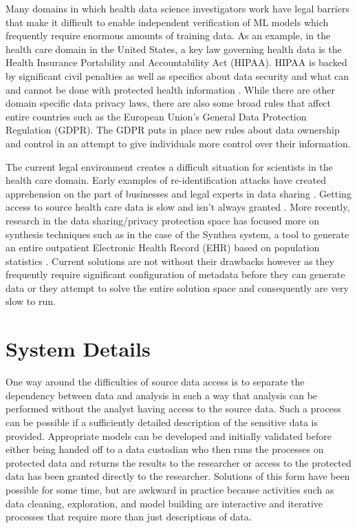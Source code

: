 \documentclass{amia}
\begin{document}
Many domains in which health data science investigators work have legal barriers that make it difficult to enable independent verification of ML models which frequently require enormous amounts of training data. As an example, in the health care domain in the United States, a key law governing health data is the Health Insurance Portability and Accountability Act (HIPAA). HIPAA is backed by significant civil penalties as well as specifics about data security and what can and cannot be done with protected health information \cite{hippaviol}. While there are other domain specific data privacy laws, there are also some broad rules that affect entire countries such as the European Union's General Data Protection Regulation (GDPR). The GDPR puts in place new rules about data ownership and control in an attempt to give individuals more control over their information.

The current legal environment creates a difficult situation for scientists in the health care domain. Early examples of re-identification attacks \cite{sweeney_2002} have created apprehension on the part of businesses and legal experts in data sharing \cite{ohm_broken_2009}. Getting access to source health care data is slow and isn't always granted \cite{hodge_legal_1999, committee_hipaa_privacy_rule_2009}. More recently, research in the data sharing/privacy protection space has focused more on synthesis techniques such as in the case of the Synthea system, a tool to generate an entire outpatient Electronic Health Record (EHR) based on population statistics \cite{walonoski_synthea_2018}. Current solutions are not without their drawbacks however as they frequently require significant configuration of metadata before they can generate data or they attempt to solve the entire solution space and consequently are very slow to run.

\section{System Details}

One way around the difficulties of source data access is to separate the dependency between data and analysis in such a way that analysis can be performed without the analyst having access to the source data. Such a process can be possible if a sufficiently detailed description of the sensitive data is provided. Appropriate models can be developed and initially validated before either being handed off to a data custodian who then runs the processes on protected data and returns the results to the researcher or access to the protected data has been granted directly to the researcher. Solutions of this form have been possible for some time, but are awkward in practice because activities such as data cleaning, exploration, and model building are interactive and iterative processes that require more than just descriptions of data.
\end{document}
